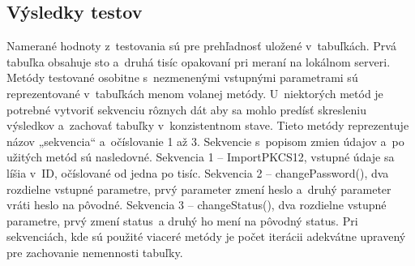 \documentclass[
  printed, %
  table,   %
oneside,
  nolof,     %
  nolot,     %
]{fithesis3}
\begin{document}
\subsection{Výsledky testov}
Namerané hodnoty z~testovania sú pre prehľadnosť uložené v~tabuľkách. Prvá tabuľka obsahuje sto a~druhá tisíc opakovaní pri meraní na lokálnom serveri. Metódy testované osobitne s~nezmenenými vstupnými parametrami sú reprezentované v~tabuľkách menom volanej metódy. U~niektorých metód je potrebné vytvoriť sekvenciu rôznych dát aby sa mohlo predísť skresleniu výsledkov a~zachovať tabuľky v~konzistentnom stave.
Tieto metódy reprezentuje názov „sekvencia“ a~očíslovanie 1 až 3. Sekvencie s~popisom zmien údajov  a~po užitých metód sú nasledovné.
Sekvencia 1 – ImportPKCS12, vstupné údaje sa líšia v~ID, očíslované od jedna po tisíc. \newline
Sekvencia 2 – changePassword(), dva rozdielne vstupné parametre, prvý parameter zmení heslo  a~druhý parameter vráti heslo na pôvodné.\newline
Sekvencia 3 – changeStatus(), dva rozdielne vstupné parametre, prvý zmení status~a druhý ho mení na pôvodný status. 
Pri sekvenciách, kde sú použité viaceré metódy je počet iterácii adekvátne upravený pre zachovanie nemennosti tabuľky. 
\begin{table}[htbp]
	\begin{center}
	\end{center}
	\caption{Ukážka nameraných hodnôt}
	\label{table:100}
\end{table}
\end{document}
